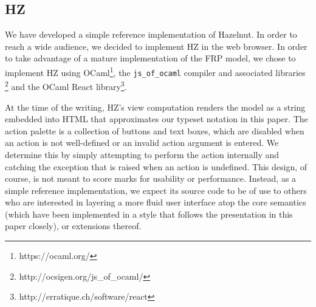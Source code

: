 \subsection{HZ}
We have developed a simple reference implementation of Hazelnut.
In order to reach a wide audience, we decided to implement HZ in the web browser.
In order to take advantage of a mature implementation of the FRP model, we chose to implement HZ using OCaml\footnote{https://ocaml.org/}, the \texttt{js\_of\_ocaml} compiler and associated libraries \cite{DBLP:conf/ml/Balat06}\footnote{http://ocsigen.org/js\_of\_ocaml/} and the OCaml React library\footnote{http://erratique.ch/software/react}.

At the time of the writing, 
HZ's view computation renders the model as a string embedded into HTML that approximates our typeset notation in this paper. The action palette is a collection of buttons and text boxes, which are disabled when an action is not well-defined or an invalid action argument is entered. We determine this by simply attempting to perform the action internally and catching the exception that is raised when an action is undefined. This design, of course, is not meant to score marks for usability or performance. Instead, as a simple reference implementation, we expect its source code to be of use to others who are interested in layering a more fluid user interface atop the core semantics (which have been implemented in a style that follows the presentation in this paper closely), or extensions thereof.
